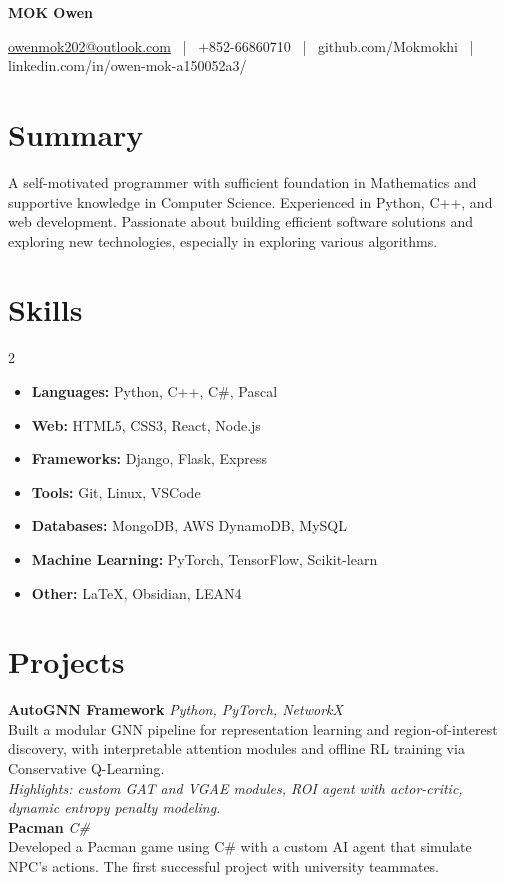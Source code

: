 \documentclass[a4paper,10pt]{article}
\newcommand{\name}[1]{\centerline{\Huge \bfseries #1}}
\newcommand{\contact}[1]{\centerline{#1}}
\newcommand{\sectionspace}{\vspace{8pt}}
\begin{document}
\name{MOK Owen}
\contact{\href{mailto:owenmok202@outlook.com}{owenmok202@outlook.com} ~|~ +852-66860710 ~|~ github.com/Mokmokhi ~|~ linkedin.com/in/owen-mok-a150052a3/}
\sectionspace

\section*{Summary}
A self-motivated programmer with sufficient foundation in Mathematics and supportive knowledge in Computer Science. Experienced in Python, C++, and web development. Passionate about building efficient software solutions and exploring new technologies, especially in exploring various algorithms.

\section*{Skills}
\begin{multicols}{2}
\begin{itemize}[leftmargin=*]
  \item \textbf{Languages:} Python, C++, C\#, Pascal
  \item \textbf{Web:} HTML5, CSS3, React, Node.js
  \item \textbf{Frameworks:} Django, Flask, Express
  \item \textbf{Tools:} Git, Linux, VSCode
  \item \textbf{Databases:} MongoDB, AWS DynamoDB, MySQL
  \item \textbf{Machine Learning:} PyTorch, TensorFlow, Scikit-learn
  \item \textbf{Other:} LaTeX, Obsidian, LEAN4
\end{itemize}
\end{multicols}

\section*{Projects}
\textbf{AutoGNN Framework} \hfill \textit{Python, PyTorch, NetworkX} \\
Built a modular GNN pipeline for representation learning and region-of-interest discovery, with interpretable attention modules and offline RL training via Conservative Q-Learning. \\
\textit{Highlights: custom GAT and VGAE modules, ROI agent with actor-critic, dynamic entropy penalty modeling.}\\

\noindent\textbf{Pacman} \hfill \textit{C\#} \\
Developed a Pacman game using C\# with a custom AI agent that simulate NPC's actions. The first successful project with university teammates.
\end{document}
